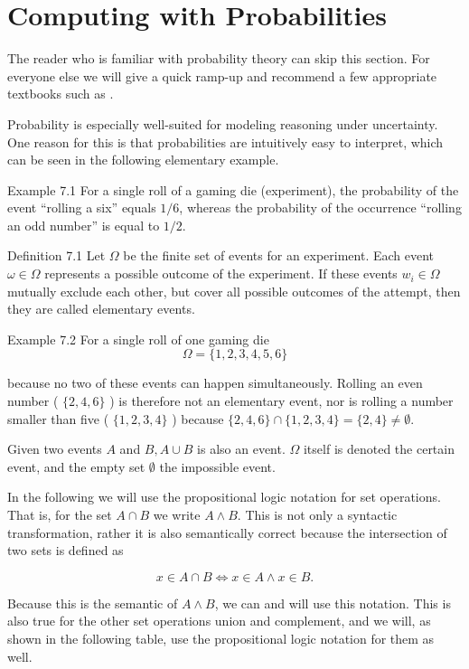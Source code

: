 \documentclass[10pt]{book}
\begin{document}
\section{Computing with Probabilities}
The reader who is familiar with probability theory can skip this section. For everyone else we will give a quick ramp-up and recommend a few appropriate textbooks such as \cite{ross2009introprob, freedman2007statistics}.

Probability is especially well-suited for modeling reasoning under uncertainty. One reason for this is that probabilities are intuitively easy to interpret, which can be seen in the following elementary example.

Example 7.1 For a single roll of a gaming die (experiment), the probability of the event ``rolling a six'' equals $1/6$, whereas the probability of the occurrence ``rolling an odd number'' is equal to $1/2$.

Definition 7.1 Let $\Omega$ be the finite set of events for an experiment. Each event $\omega \in \Omega$ represents a possible outcome of the experiment. If these events $w_{i} \in \Omega$ mutually exclude each other, but cover all possible outcomes of the attempt, then they are called elementary events.

Example 7.2 For a single roll of one gaming die
$$
\Omega=\{1,2,3,4,5,6\}
$$

because no two of these events can happen simultaneously. Rolling an even number ( $\{2,4,6\}$ ) is therefore not an elementary event, nor is rolling a number smaller than five ( $\{1,2,3,4\}$ ) because $\{2,4,6\} \cap\{1,2,3,4\}=\{2,4\} \neq \emptyset$.

Given two events $A$ and $B, A \cup B$ is also an event. $\Omega$ itself is denoted the certain event, and the empty set $\emptyset$ the impossible event.

In the following we will use the propositional logic notation for set operations. That is, for the set $A \cap B$ we write $A \wedge B$. This is not only a syntactic transformation, rather it is also semantically correct because the intersection of two sets is defined as

$$
x \in A \cap B \Leftrightarrow x \in A \wedge x \in B .
$$

Because this is the semantic of $A \wedge B$, we can and will use this notation. This is also true for the other set operations union and complement, and we will, as shown in the following table, use the propositional logic notation for them as well.
\end{document}
